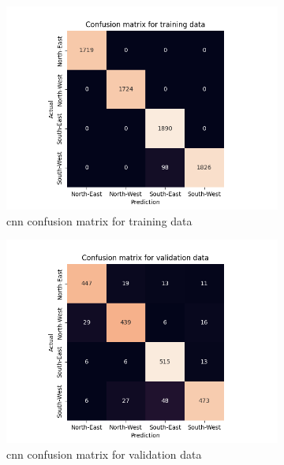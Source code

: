 \documentclass[10pt,twocolumn,letterpaper]{article}
\begin{document}
\begin{figure}
  \centering
  \begin{subfigure}{.33\linewidth}
    \includegraphics[width=\linewidth, trim={7em, 0em, 9em, 5em}, clip]{cnn_aug_cfsn_train}
    \caption{\acrshort{cnn} confusion matrix for training data}
    \label{fig:cnn_train}
  \end{subfigure}
  \begin{subfigure}{0.33\linewidth}
    \includegraphics[width=\linewidth, trim={7em, 0em, 9em, 5em}, clip]{cnn_aug_cfsn_valid}
    \caption{\acrshort{cnn} confusion matrix for validation data}
    \label{fig:cnn_valid}
  \end{subfigure}
  \begin{subfigure}{0.33\linewidth}

\end{subfigure}
\end{figure}
\end{document}
